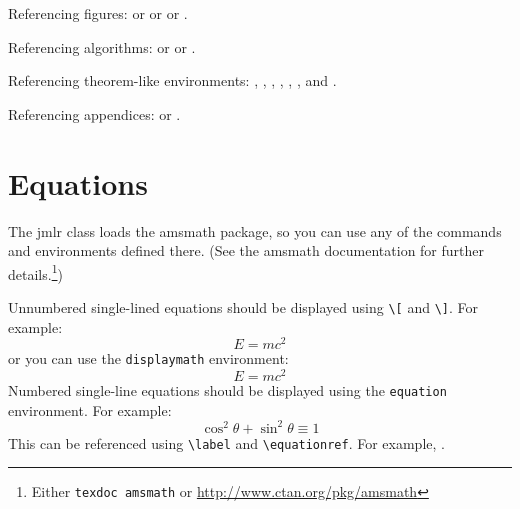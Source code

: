 \documentclass[pmlr,twocolumn]{jmlr} %
\begin{document}
Referencing figures:  or
 or
 or
.

Referencing algorithms:  or
 or
.

Referencing theorem-like environments: ,
, , 
, ,
,  and
.

Referencing appendices:  or
.

\section{Equations}
\label{sec:math}

The \textsf{jmlr} class loads the \textsf{amsmath} package, so
you can use any of the commands and environments defined there.
(See the \textsf{amsmath} documentation for further
details.\footnote{Either \texttt{texdoc amsmath} or
\url{http://www.ctan.org/pkg/amsmath}})

Unnumbered single-lined equations should be displayed using
\verb|\[| and \verb|\]|. For example:
\[E = m c^2\]
or you can use the \texttt{displaymath} environment:
\begin{displaymath}
E = m c^2
\end{displaymath}
Numbered single-line equations should be displayed using the
\texttt{equation} environment. For example:
\begin{equation}\label{eq:trigrule}
\cos^2\theta + \sin^2\theta \equiv 1
\end{equation}
This can be referenced using \verb|\label| and \verb|\equationref|.
For example, .
\end{document}
